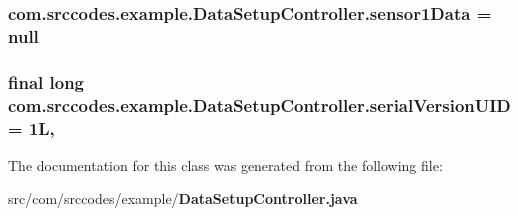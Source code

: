 \subsubsection[{sensor1\-Data}]{ com.\-srccodes.\-example.\-Data\-Setup\-Controller.\-sensor1\-Data = null}\label{classcom_1_1srccodes_1_1example_1_1_data_setup_controller_a4dad9fa56751a65680df7d00e400d3e6}
\subsubsection[{serial\-Version\-U\-I\-D}]{\setlength{\rightskip}{0pt plus 5cm}final long com.\-srccodes.\-example.\-Data\-Setup\-Controller.\-serial\-Version\-U\-I\-D = 1\-L\hspace{0.3cm}{\ttfamily [static]}, {\ttfamily [private]}}\label{classcom_1_1srccodes_1_1example_1_1_data_setup_controller_a8aa6450c4abe10d221e48d978bfc62ad}


The documentation for this class was generated from the following file\-:\begin{DoxyCompactItemize}
\item 
src/com/srccodes/example/{\bf Data\-Setup\-Controller.\-java}\end{DoxyCompactItemize}
